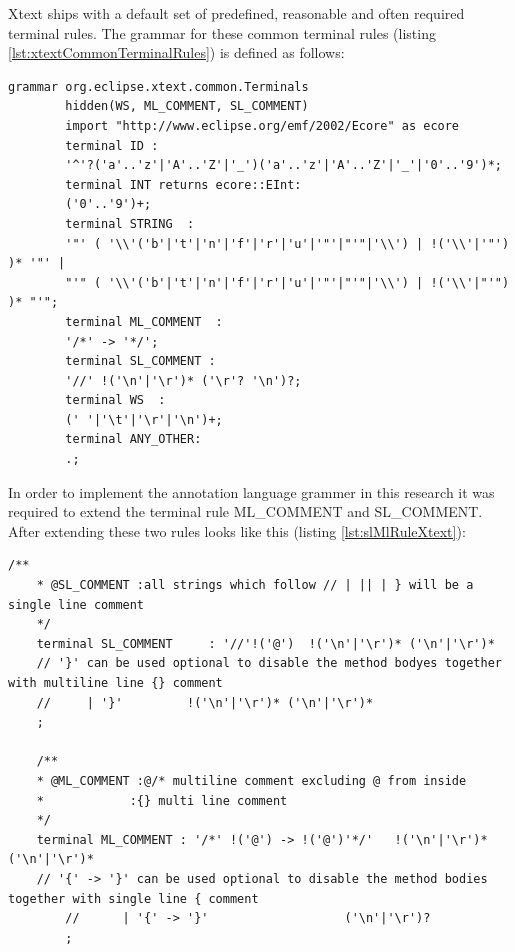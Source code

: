 Xtext ships with a default set of predefined, reasonable and often required terminal rules. The grammar for these common terminal rules (listing \ref{lst:xtextCommonTerminalRules}) is defined as follows:
	\begin{lstlisting}[caption={Common terminal Rules in Xtext },label=lst:xtextCommonTerminalRules]
		grammar org.eclipse.xtext.common.Terminals 
		hidden(WS, ML_COMMENT, SL_COMMENT)
		import "http://www.eclipse.org/emf/2002/Ecore" as ecore
		terminal ID : 
		'^'?('a'..'z'|'A'..'Z'|'_')('a'..'z'|'A'..'Z'|'_'|'0'..'9')*;
		terminal INT returns ecore::EInt: 
		('0'..'9')+;
		terminal STRING  : 
		'"' ( '\\'('b'|'t'|'n'|'f'|'r'|'u'|'"'|"'"|'\\') | !('\\'|'"') )* '"' |
		"'" ( '\\'('b'|'t'|'n'|'f'|'r'|'u'|'"'|"'"|'\\') | !('\\'|"'") )* "'"; 
		terminal ML_COMMENT  : 
		'/*' -> '*/';
		terminal SL_COMMENT : 
		'//' !('\n'|'\r')* ('\r'? '\n')?;
		terminal WS  : 
		(' '|'\t'|'\r'|'\n')+;
		terminal ANY_OTHER: 
		.;
	\end{lstlisting}

In order to implement the annotation language grammer in this research it was required to extend the terminal rule ML\_COMMENT and SL\_COMMENT. After extending these two rules looks like this (listing \ref{lst:slMlRuleXtext}):

\begin{lstlisting}[caption={Singleline and Multiline Comments Rule in Xtext},label=lst:slMlRuleXtext]
	/**
	* @SL_COMMENT :all strings which follow // | || | } will be a single line comment
	*/ 
	terminal SL_COMMENT 	: '//'!('@')  !('\n'|'\r')* ('\n'|'\r')*
	// '}' can be used optional to disable the method bodyes together with multiline line {} comment 
	//     | '}'         !('\n'|'\r')* ('\n'|'\r')*               
	;
	
	/**
	* @ML_COMMENT :@/* multiline comment excluding @ from inside
	*            :{} multi line comment 
	*/ 
	terminal ML_COMMENT	: '/*' !('@') -> !('@')'*/'   !('\n'|'\r')* ('\n'|'\r')*   
	// '{' -> '}' can be used optional to disable the method bodies together with single line { comment 
		//      | '{' -> '}'                   ('\n'|'\r')?
		;   
\end{lstlisting}

